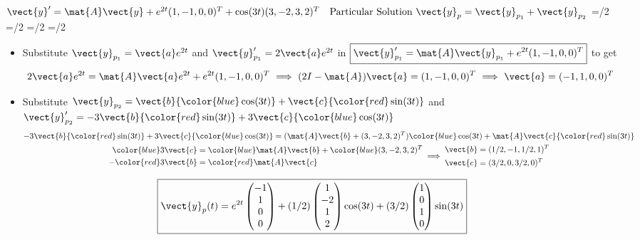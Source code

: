\begin{frame}{$\vect{y}'=\mat{A}\vect{y}+e^{2t}(1,-1,0,0)^T+\cos(3t)(3,-2,3,2)^T\quad\text{Particular Solution }\vect{y}_p=\vect{y}_{p_1}+\vect{y}_{p_2}$}
\abovedisplayskip=\glueexpr\abovedisplayskip/2\relax
\belowdisplayskip=\glueexpr\belowdisplayskip/2\relax
\abovedisplayshortskip=\glueexpr\abovedisplayshortskip/2\relax
\belowdisplayshortskip=\glueexpr\belowdisplayshortskip/2\relax
\begin{itemize}
  \item Substitute $\vect{y}_{p_1}=\vect{a}e^{2t}$ and  $\vect{y}_{p_1}'=2\vect{a}e^{2t}$ in 
  $\boxed{\vect{y}_{p_1}' =\mat{A}\vect{y}_{p_1}+e^{2t}(1,-1,0,0)^T}$ to get
  \[
    2\vect{a}e^{2t}=\mat{A}\vect{a}e^{2t}+e^{2t}(1,-1,0,0)^T
    \ \Longrightarrow\ (2I-\mat{A})\vect{a}=(1,-1,0,0)^T
    \ \Longrightarrow\ \vect{a}=(-1,1,0,0)^T
  \]
  \item Substitute $\vect{y}_{p_2}=\vect{b}{\color{blue}\cos(3t)}+\vect{c}{\color{red}\sin(3t)}$ and $\vect{y}_{p_2}'=-3\vect{b}{\color{red}\sin(3t)}+3\vect{c}{\color{blue}\cos(3t)}$ 
  \[
    \begin{gathered}
      -3\vect{b}{\color{red}\sin(3t)}+3\vect{c}{\color{blue}\cos(3t)}=(\mat{A}\vect{b}+(3,-2,3,2)^T){\color{blue}\cos(3t)}+\mat{A}\vect{c}{\color{red}\sin(3t)}\\
      \begin{aligned}
        {\color{blue}3\vect{c}}&={\color{blue}\mat{A}\vect{b}}+{\color{blue}(3,-2,3,2)^T}\\
        -{\color{red}3\vect{b}}&={\color{red}\mat{A}\vect{c}}
      \end{aligned}
      \;\Longrightarrow\;
      \begin{aligned}
        \vect{b}&=(1/2,-1,1/2,1)^T\\
        \vect{c}&=(3/2,0,3/2,0)^T
      \end{aligned}
    \end{gathered}
  \]
\end{itemize}
\[
  \boxed{\vect{y}_p(t)=e^{2t}\begin{pmatrix}-1\\1\\0\\0\end{pmatrix}
    +(1/2)\begin{pmatrix}1\\-2\\1\\2\end{pmatrix}\cos(3t)
    +(3/2)\begin{pmatrix}1\\0\\1\\0\end{pmatrix}\sin(3t)}
\]
\end{frame}
